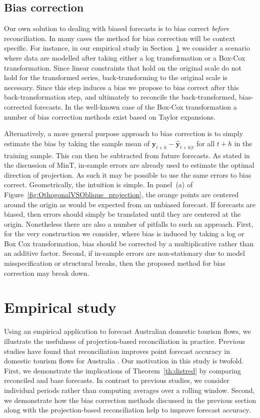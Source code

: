 \documentclass[12pt]{article}
\theoremstyle{definition}
\begin{document}
\subsection{Bias correction}

Our own solution to dealing with biased forecasts is to bias correct \emph{before} reconciliation. In many cases the method for bias correction will be context specific. For instance, in our empirical study in Section~\ref{sec:EmpStudy} we consider a scenario where {\color{blue} data are modelled after} taking either a log transformation or a Box-Cox transformation. {\color{blue} Since linear constraints that hold on the original scale do not hold for the transformed series, back-transforming to the original scale is necessary.  Since this step induces a bias we propose to bias correct after this back-transformation step, and ultimately to reconcile the back-transformed, bias-corrected forecasts.}  In the well-known case {\color{blue} of the Box-Cox transformation} a number of bias correction methods exist based on Taylor expansions.

Alternatively, a more general purpose approach to bias correction is to simply estimate the bias by taking the sample mean of $\bm{y}_{t+h}-\hat{\bm{y}}_{t+h|t}$ for all $t+h$ in the training sample. This can then be subtracted from future forecasts. As stated in the discussion of MinT, in-sample errors are already used to estimate the optimal direction of projection. As such it may be possible to use the same errors to bias correct. Geometrically, the intuition is simple. In panel~(a) of Figure~\ref{fig:OthogonalVSOblique_projection}, the orange points are centered around the origin as would be expected from an unbiased forecast. If forecasts are biased, then errors should simply be translated until they are centered at the origin. Nonetheless there are also a number of pitfalls to such an approach. First, for the very construction we consider, where bias is induced by taking a log or Box Cox transformation, bias should be corrected by a multiplicative rather than an additive factor. Second, if in-sample errors are non-stationary due to model misspecification or structural breaks, then the proposed method for bias correction may break down.

\section{Empirical study}\label{sec:EmpStudy}

Using an empirical application to forecast Australian domestic tourism flows, we illustrate the usefulness of projection-based reconciliation in practice. Previous studies have found that reconciliation improves point forecast accuracy in domestic tourism flows for Australia \citep[see for example][]{Athanasopoulos2009, Hyndman2011,WicEtAl2019}. Our motivation in this study is twofold. First, we demonstrate the implications of Theorem~\ref{th:distred} by comparing reconciled and base forecasts. In contrast to previous studies, we consider individual periods rather than computing averages over a rolling window. Second, we demonstrate how the bias correction methods discussed in the previous section along with the projection-based reconciliation help to improve forecast accuracy.
\end{document}
